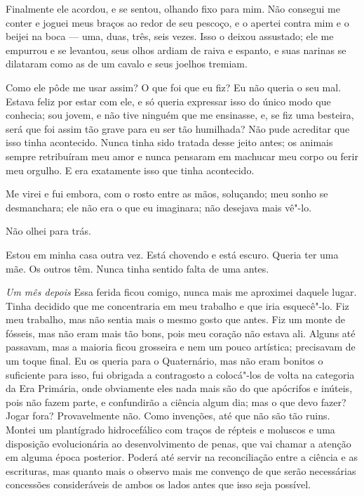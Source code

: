 Finalmente ele acordou, e se sentou, olhando fixo para mim. Não consegui me conter e
joguei meus braços ao redor de seu pescoço, e o apertei contra mim e o beijei
na boca --- uma, duas, três, seis vezes. Isso o deixou assustado; ele me empurrou e se
levantou, seus olhos ardiam de raiva e espanto, e suas narinas se dilataram 
como as de um cavalo e seus joelhos tremiam.

Como ele pôde me usar assim? O que foi que eu fiz? Eu não queria o seu mal. Estava
feliz por estar com ele, e só queria expressar isso do único modo que conhecia;
sou jovem, e não tive ninguém que me ensinasse, e, se fiz uma besteira, será que foi
assim tão grave para eu ser tão humilhada? Não pude acreditar que isso tinha
acontecido. Nunca tinha sido tratada desse jeito antes; os animais sempre
retribuíram meu amor e nunca pensaram em machucar meu corpo ou ferir meu
orgulho. E era exatamente isso que tinha acontecido.

Me virei e fui embora, com o rosto entre as mãos, soluçando; meu sonho se desmanchara; 
ele não era o que eu imaginara; não desejava mais vê"-lo.

Não olhei para trás.

Estou em minha casa outra vez. Está chovendo e está escuro. Queria ter uma mãe. Os
outros têm. Nunca tinha sentido falta de uma antes.

\textit{Um mês depois} Essa ferida ficou comigo, nunca mais me aproximei
daquele lugar. Tinha decidido que me concentraria em meu trabalho e que iria
esquecê"-lo. Fiz meu trabalho, mas não sentia mais o mesmo gosto que antes.
Fiz um monte de fósseis, mas não eram mais tão bons, pois meu coração não estava
ali. Alguns até passavam, mas a maioria ficou grosseira e nem um pouco artística;
precisavam de um toque final. Eu os queria para o Quaternário, mas não eram bonitos
o suficiente para isso, fui obrigada a contragosto a colocá"-los de volta na
categoria da Era Primária, onde obviamente eles nada mais são do que apócrifos e
inúteis, pois não fazem parte, e confundirão a ciência algum dia; mas o que devo
fazer? Jogar fora? Provavelmente não. Como invenções, até que não são tão
ruins. Montei um plantígrado hidrocefálico com traços de répteis e
moluscos e uma disposição evolucionária ao desenvolvimento de penas, que vai     
chamar a atenção em alguma época posterior. Poderá até servir na reconciliação
entre a ciência e as escrituras, mas quanto mais o observo mais me convenço
de que serão necessárias concessões consideráveis de ambos os lados antes que isso seja possível.

